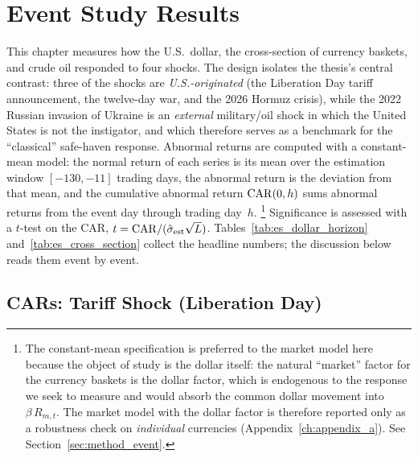 %

\chapter{Event Study Results}
\label{ch:event_study}

This chapter measures how the U.S.\ dollar, the cross-section of currency baskets, and
crude oil responded to four shocks. The design isolates the thesis's central contrast:
three of the shocks are \emph{U.S.-originated} (the Liberation Day tariff announcement,
the twelve-day war, and the 2026 Hormuz crisis), while the 2022 Russian invasion of
Ukraine is an \emph{external} military/oil shock in which the United States is not the
instigator, and which therefore serves as a benchmark for the ``classical'' safe-haven
response. Abnormal returns are computed with a constant-mean model: the normal return of
each series is its mean over the estimation window $[-130,-11]$ trading days, the
abnormal return is the deviation from that mean, and the cumulative abnormal return
$\mathrm{CAR}(0,h)$ sums abnormal returns from the event day through trading day~$h$.%
\footnote{The constant-mean specification is preferred to the market model here because
the object of study is the dollar itself: the natural ``market'' factor for the currency
baskets is the dollar factor, which is endogenous to the response we seek to measure and
would absorb the common dollar movement into $\beta\,R_{m,t}$. The market model with the
dollar factor is therefore reported only as a robustness check on \emph{individual}
currencies (Appendix~\ref{ch:appendix_a}). See Section~\ref{sec:method_event}.}
Significance is assessed with a $t$-test on the CAR, $t=\mathrm{CAR}/(\hat\sigma_{\text{est}}
\sqrt{L})$. Tables~\ref{tab:es_dollar_horizon} and~\ref{tab:es_cross_section} collect the
headline numbers; the discussion below reads them event by event.




\section{CARs: Tariff Shock (Liberation Day)}
\label{sec:es_tariff}

